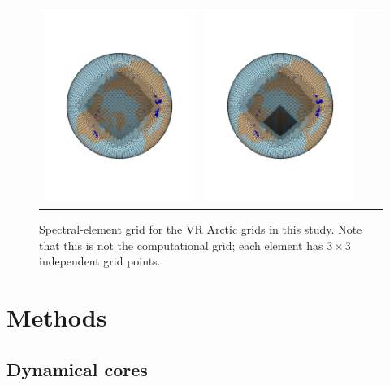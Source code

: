 \documentclass[draft]{agujournal2019}
\begin{document}
\begin{figure}[t]
\begin{center}
\begin{tabular}{cccc}
         \includegraphics[width=60mm]{figs/grid-ARCTIC.pdf}&
         \includegraphics[width=60mm]{figs/grid-ARCTICGRIS.pdf} \\
\end{tabular}
\end{center}
\caption{Spectral-element grid for the VR Arctic grids in this study. Note that this is not the computational grid; each element has $3\times3$ independent grid points.}
\label{fig:vr-grids}
\end{figure}

\section{Methods}\label{sec:methods}
\subsection{Dynamical cores}
\end{document}

